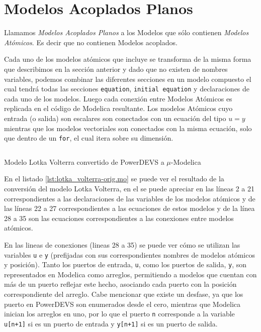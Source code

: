 \section{Modelos Acoplados Planos}

        Llamamos \emph{Modelos Acoplados Planos} a los Modelos que sólo contienen \emph{Modelos Atómicos}. Es decir que no contienen Modelos acoplados.

        Cada uno de los modelos atómicos que incluye se transforma de la misma forma que describimos en la sección anterior y dado que no existen  
        de nombres variables, podemos combinar las diferentes secciones en un modelo compuesto el cual tendrá todas las secciones \texttt{equation}, 
	\texttt{initial equation} y declaraciones de cada uno de los modelos.
        Luego cada conexión entre Modelos Atómicos es replicada en el código de Modelica resultante. Los modelos Atómicos cuyo entrada (o salida) 
	son escalares son conectados con un ecuación del tipo $u = y$ mientras que los modelos vectoriales son conectados con la misma ecuación, 
	solo que dentro de un \texttt{for}, el cual itera sobre su dimensión.

\begin{listing}[H]
        \inputminted[linenos]{modelica}{src/lotka_volterra-orig.mo}
        \caption{Modelo Lotka Volterra convertido de PowerDEVS a $\mu$-Modelica}
        \label{lst:lotka_volterra-orig.mo}
\end{listing}

        En el listado \ref{lst:lotka_volterra-orig.mo} se puede ver el resultado de la conversión del modelo Lotka Volterra, en el se puede apreciar en las líneas 
        2 a 21 correspondientes a las declaraciones de las variables de los modelos atómicos y de las líneas 22 a 27 correspondientes a las ecuaciones de estos 
        modelos y de la línea 28 a 35 son las ecuaciones correspondientes a las conexiones entre modelos atómicos.

        En las lineas de conexiones (lineas 28 a 35) se puede ver cómo se utilizan las variables \texttt{u} e \texttt{y} (prefijadas con sus correspondientes nombres 
	de modelos atómicos y posición). Tanto los puertos de entrada, \texttt{u}, como los puertos de salida, \texttt{y}, son representados en Modelica como arreglos,
        permitiendo a modelos que cuentan con más de un puerto reflejar este hecho, asociando cada puerto con la posición correspondiente del arreglo. 
        Cabe mencionar que existe un desfase, ya que los puerto en PowerDEVS son enumerados desde el cero, mientras que Modelica inician los arreglos en uno, por lo
        que el puerto \texttt{n} corresponde a la variable \texttt{u[n+1]} si es un puerto de entrada y \texttt{y[n+1]} si es un puerto de salida.

